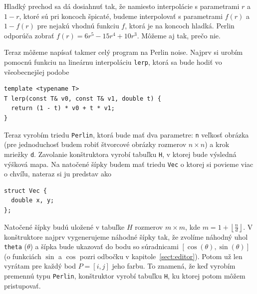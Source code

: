 \documentclass[10pt]{article}
\def\ods{\vspace*{10pt}}
\begin{document}
{\phantom{a}
\hfill
{}
  \hfill
{}
\hfill
\phantom{a}

\ods
Hladký prechod sa dá dosiahnuť tak, že namiesto interpolácie s parametrami $r$ a $1-r$, ktoré
sú pri koncoch špicaté, budeme interpolovať s parametrami $f(r)$ a $1-f(r)$ pre nejakú
vhodnú funkciu $f$, ktorá je na koncoch hladká. Perlin odporúča zobrať 
$f(r)=6r^5-15r^4+10r^3$. Môžeme aj tak, prečo nie.

\ods 
Teraz môžeme napísať takmer celý program na Perlin noise. 
Najprv si urobím pomocnú funkciu na lineárnu interpoláciu {\tt lerp}, ktorá sa
bude hodiť vo všeobecnejšej podobe

\ods
\begin{lstlisting}
template <typename T>
T lerp(const T& v0, const T& v1, double t) {
  return (1 - t) * v0 + t * v1;
}
\end{lstlisting}

\ods
Teraz vyrobím triedu {\tt Perlin},
ktorá bude mať dva parametre: {\tt n} veľkosť obrázka (pre jednoduchosť budem
robiť štvorcové obrázky rozmerov $n\times n$) a krok mriežky {\tt d}.
Zavolanie konštruktora vyrobí tabuľku {\tt H}, v ktorej bude výsledná výšková
mapa. Na natočené šípky budem mať triedu {\tt Vec} o ktorej si povieme viac o 
chvíľu, nateraz si ju predstav ako 

\ods
\begin{lstlisting}
struct Vec {
  double x, y;
};
\end{lstlisting}

\ods
Natočené šípky budú uložené v tabuľke $H$ rozmerov $m\times m$, kde 
$m=1+\left\lfloor\frac{n}{d}\right\rfloor$. V konštruktore
najprv vygenerujeme náhodné šípky tak, že zvolíme náhodný uhol {\tt theta} ($\theta$)
a šípka bude ukazovať do bodu so súradnicami $[\cos(\theta),\sin(\theta)]$
(o funkciách $\sin$ a $\cos$ pozri odbočku v kapitole~\ref{sect:editor}).
Potom už len vyrátam pre každý bod $P=[i,j]$ jeho farbu.
To znamená, že keď vyrobím premennú typu {\tt Perlin}, konštruktor vyrobí tabuľku {\tt H},
ku ktorej potom môžem pristupovať.

}
\end{document}
